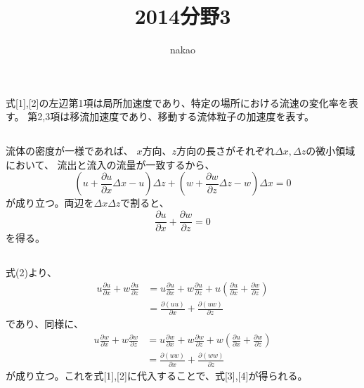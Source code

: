 \documentclass[a4paper]{jsarticle}
\begin{document}
\title{2014分野3}
\author{nakao}
\maketitle

\section{}
\subsection{}
式[1],[2]の左辺第1項は局所加速度であり、特定の場所における流速の変化率を表す。
第2,3項は移流加速度であり、移動する流体粒子の加速度を表す。

\subsection{}
流体の密度が一様であれば、
$x$方向、$z$方向の長さがそれぞれ$\Delta x, \Delta z$の微小領域において、
流出と流入の流量が一致するから、
\begin{equation}
  (u + \frac{\partial u}{\partial x} \Delta x - u) \Delta z
  + (w + \frac{\partial w}{\partial z} \Delta z - w) \Delta x = 0
\end{equation}
が成り立つ。両辺を$\Delta x \Delta z$で割ると、
\begin{equation}
  \frac{\partial u}{\partial x} + \frac{\partial w}{\partial z} = 0
\end{equation}
を得る。

\subsection{}
式(2)より、
\begin{equation}
  \begin{aligned}
    u \frac{\partial u}{\partial x} + w \frac{\partial u}{\partial z}
    &= u \frac{\partial u}{\partial x} + w \frac{\partial u}{\partial z}
    + u \left(\frac{\partial u}{\partial x} + \frac{\partial w}{\partial z}\right) \\
    &= \frac{\partial (uu)}{\partial x} + \frac{\partial (uw)}{\partial z}
  \end{aligned}
\end{equation}
であり、同様に、
\begin{equation}
  \begin{aligned}
    u \frac{\partial w}{\partial x} + w \frac{\partial w}{\partial z}
    &= u \frac{\partial w}{\partial x} + w \frac{\partial w}{\partial z}
    + w \left(\frac{\partial u}{\partial x} + \frac{\partial w}{\partial z}\right) \\
    &= \frac{\partial (uw)}{\partial x} + \frac{\partial (ww)}{\partial z}
  \end{aligned}
\end{equation}
が成り立つ。これを式[1],[2]に代入することで、式[3],[4]が得られる。
\end{document}
